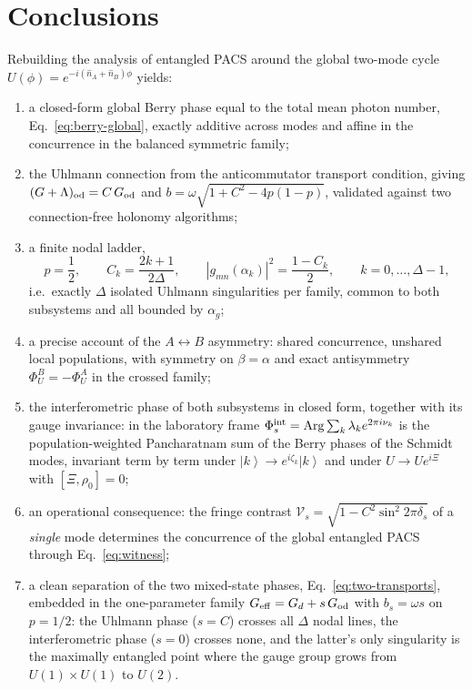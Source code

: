 \documentclass[11pt]{article}
\newcommand{\ket}[1]{\left|#1\right\rangle}
\newcommand{\Arg}{\operatorname{Arg}}
\newcommand{\nop}{\hat n}
\begin{document}
\section{Conclusions}

Rebuilding the analysis of entangled PACS around the global two-mode cycle
$U(\phi)=e^{-i(\nop_A+\nop_B)\phi}$ yields:

\begin{enumerate}[label=(\roman*)]
\item a closed-form global Berry phase equal to the total mean photon number,
      Eq.~\eqref{eq:berry-global}, exactly additive across modes and affine in
      the concurrence in the balanced symmetric family;
\item the Uhlmann connection from the anticommutator transport condition,
      giving $(G+\Lambda)_{\rm od}=C\,G_{\rm od}$ and
      $b=\omega\sqrt{1+C^2-4p(1-p)}$, validated against two connection-free
      holonomy algorithms;
\item a finite nodal ladder,
      \begin{equation}
      p=\frac12,\qquad C_k=\frac{2k+1}{2\Delta},\qquad
      |g_{mn}(\alpha_k)|^2=\frac{1-C_k}{2},\qquad k=0,\dots,\Delta-1 ,
      \end{equation}
      i.e.\ exactly $\Delta$ isolated Uhlmann singularities per family, common
      to both subsystems and all bounded by $\alpha_g$;
\item a precise account of the $A\leftrightarrow B$ asymmetry: shared
      concurrence, unshared local populations, with symmetry on $\beta=\alpha$
      and exact antisymmetry $\Phi_U^B=-\Phi_U^A$ in the crossed family;
\item the interferometric phase of both subsystems in closed form, together
      with its gauge invariance: in the laboratory frame
      $\Phi^{\rm int}_s=\Arg\sum_k\lambda_ke^{2\pi i\nu_k}$ is the
      population-weighted Pancharatnam sum of the Berry phases of the Schmidt
      modes, invariant term by term under $\ket{k}\to e^{i\zeta_k}\ket{k}$ and
      under $U\to Ue^{i\Xi}$ with $[\Xi,\rho_0]=0$;
\item an operational consequence: the fringe contrast
      $\mathcal V_s=\sqrt{1-C^2\sin^2 2\pi\delta_s}$ of a \emph{single} mode
      determines the concurrence of the global entangled PACS through
      Eq.~\eqref{eq:witness};
\item a clean separation of the two mixed-state phases,
      Eq.~\eqref{eq:two-transports}, embedded in the one-parameter family
      $G_{\rm eff}=G_d+s\,G_{\rm od}$ with $b_s=\omega s$ on $p=1/2$: the
      Uhlmann phase ($s=C$) crosses all $\Delta$ nodal lines, the
      interferometric phase ($s=0$) crosses none, and the latter's only
      singularity is the maximally entangled point where the gauge group grows
      from $U(1)\times U(1)$ to $U(2)$.
\end{enumerate}
\end{document}
